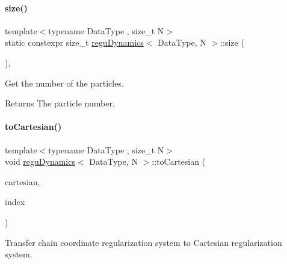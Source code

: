 \paragraph{\texorpdfstring{size()}{size()}}
{\footnotesize\ttfamily template$<$typename Data\+Type , size\+\_\+t N$>$ \\
static constexpr size\+\_\+t \mbox{\hyperlink{classregu_dynamics}{regu\+Dynamics}}$<$ Data\+Type, N $>$\+::size (\begin{DoxyParamCaption}{ }\end{DoxyParamCaption})\hspace{0.3cm}{\ttfamily [inline]}, {\ttfamily [static]}}



Get the number of the particles. 

\begin{DoxyReturn}{Returns}
The particle number. 
\end{DoxyReturn}
\mbox{\label{classregu_dynamics_a3dd8d377588308a02396ca6d06945859}} 
\paragraph{\texorpdfstring{to\+Cartesian()}{toCartesian()}}
{\footnotesize\ttfamily template$<$typename Data\+Type , size\+\_\+t N$>$ \\
void \mbox{\hyperlink{classregu_dynamics}{regu\+Dynamics}}$<$ Data\+Type, N $>$\+::to\+Cartesian (\begin{DoxyParamCaption}\item[{\mbox{\hyperlink{classregu_dynamics}{regu\+Dynamics}}$<$ Data\+Type, N $>$ \&}]{cartesian,  }\item[{\mbox{\hyperlink{classregu_dynamics_a2c9fa7372e4a11be9d85728b4a0e455f}{Index\+Array}} \&}]{index }\end{DoxyParamCaption})\hspace{0.3cm}{\ttfamily [inline]}}



Transfer chain coordinate regularization system to Cartesian regularization system. 

